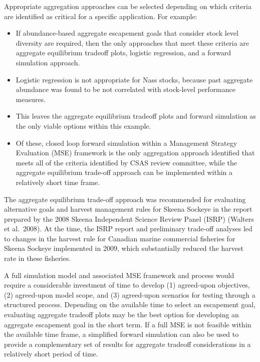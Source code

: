 \documentclass[french,11pt]{book}
\begin{document}
Appropriate aggregation approaches can be selected depending on which criteria are identified as critical for a specific application. For example:
\begin{itemize}

\item
  If abundance-based aggregate escapement goals that consider stock level diversity are required, then the only approaches that meet these criteria are aggregate equilibrium tradeoff plots, logistic regression, and a forward simulation approach.
\item
  Logistic regression is not appropriate for Nass stocks, because past aggregate abundance was found to be not correlated with stock-level performance measures.
\item
  This leaves the aggregate equilibrium tradeoff plots and forward simulation as the only viable options within this example.
\item
  Of these, closed loop forward simulation within a Management Strategy Evaluation (MSE) framework is the only aggregation approach identified that meets all of the criteria identified by CSAS review committee, while the aggregate equilibrium trade-off approach can be implemented within a relatively short time frame.
\end{itemize}
The aggregate equilibrium trade-off approach was recommended for evaluating alternative goals and harvest management rules for Skeena Sockeye in the report prepared by the 2008 Skeena Independent Science Review Panel (ISRP) (Walters et al.~2008). At the time, the ISRP report and preliminary trade-off analyses led to changes in the harvest rule for Canadian marine commercial fisheries for Skeena Sockeye implemented in 2009, which substantially reduced the harvest rate in these fisheries.

A full simulation model and associated MSE framework and process would require a considerable investment of time to develop (1) agreed-upon objectives, (2) agreed-upon model scope, and (3) agreed-upon scenarios for testing through a structured process. Depending on the available time to select an escapement goal, evaluating aggregate tradeoff plots may be the best option for developing an aggregate escapement goal in the short term. If a full MSE is not feasible within the available time frame, a simplified forward simulation can also be used to provide a complementary set of results for aggregate tradeoff considerations in a relatively short period of time.

\clearpage
\end{document}
